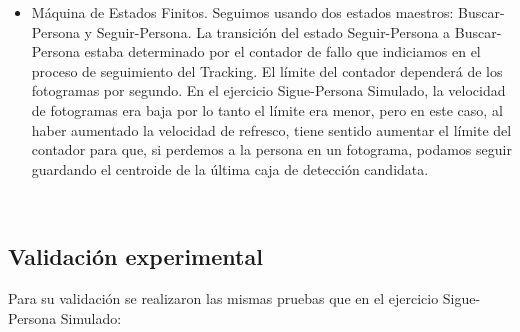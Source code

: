 \begin{itemize}
	\item Máquina de Estados Finitos. Seguimos usando dos estados maestros: Buscar-Persona y Seguir-Persona. La transición del estado Seguir-Persona a Buscar-Persona estaba determinado por el contador de fallo que indiciamos en el proceso de seguimiento del Tracking. El límite del contador dependerá de los fotogramas por segundo. En el ejercicio Sigue-Persona Simulado, la velocidad de fotogramas era baja por lo tanto el límite era menor, pero en este caso, al haber aumentado la velocidad de refresco, tiene sentido aumentar el límite del contador para que, si perdemos a la persona en un fotograma, podamos seguir guardando el centroide de la última caja de detección candidata.
\end{itemize}\




\subsection{Validación experimental}
\label{subsec:validacion_experimental_real}

Para su validación se realizaron las mismas pruebas que en el ejercicio Sigue-Persona Simulado:\\

